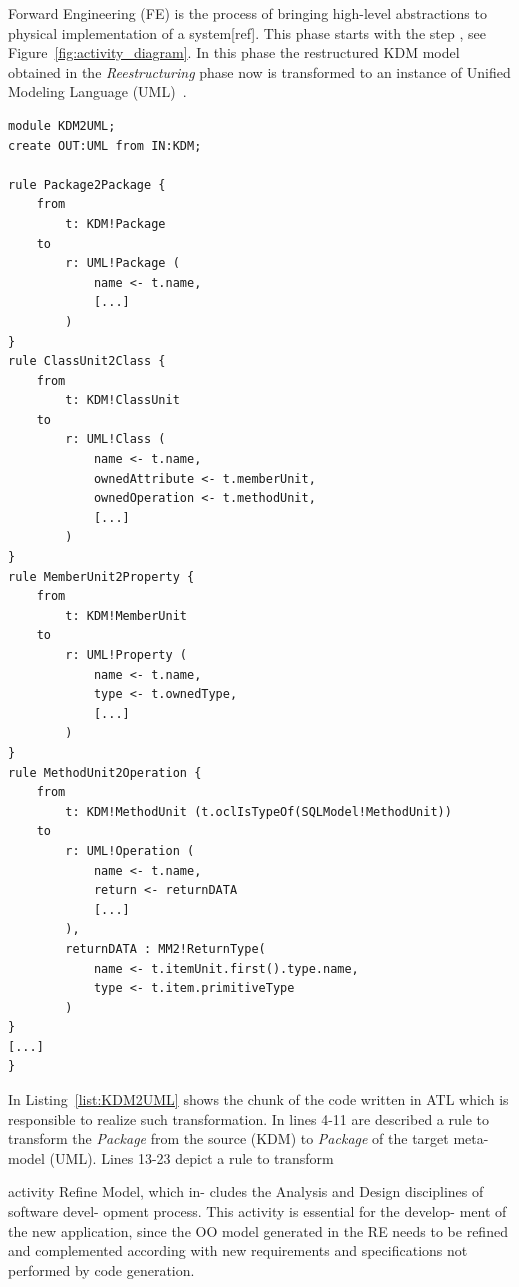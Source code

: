 \documentclass[a4paper,twoside]{article}
\newcommand*\circled[1]{\tikz[baseline=(char.base)]{
  \node[shape=circle,draw, inner sep=0.1pt] (char) {#1};}
}
\begin{document}
Forward Engineering (FE) is the process of bringing high-level abstractions to physical implementation of a system[ref]. This phase starts with the step \circled{\textbf{K}}, see Figure~\ref{fig:activity_diagram}. In this phase the restructured KDM model obtained in the \textit{Reestructuring} phase now is transformed to an instance of Unified Modeling Language (UML)~\cite{OMG}. 

\begin{lstlisting}[caption=Chunk of KDM2UML, label=list:KDM2UML, frame=lrtb, basicstyle=\tiny]
module KDM2UML;
create OUT:UML from IN:KDM;

rule Package2Package {
	from 
		t: KDM!Package
	to
		r: UML!Package (	
			name <- t.name,
			[...]
		)
}
rule ClassUnit2Class {
	from
		t: KDM!ClassUnit
	to
		r: UML!Class (
			name <- t.name,
			ownedAttribute <- t.memberUnit,
			ownedOperation <- t.methodUnit,
			[...]
		)
}
rule MemberUnit2Property {
	from
		t: KDM!MemberUnit
	to
		r: UML!Property (
			name <- t.name,
			type <- t.ownedType,
			[...]
		)
}
rule MethodUnit2Operation {	
	from
		t: KDM!MethodUnit (t.oclIsTypeOf(SQLModel!MethodUnit))
	to
		r: UML!Operation (
			name <- t.name,
			return <- returnDATA
			[...]
		),
		returnDATA : MM2!ReturnType(
			name <- t.itemUnit.first().type.name,
			type <- t.item.primitiveType
		)
}
[...]
}
\end{lstlisting}

In Listing~\ref{list:KDM2UML} shows the chunk of the code written in ATL which is responsible to realize such transformation. In lines 4-11 are described a rule to transform the \textit{Package} from the source (KDM) to \textit{Package} of the target meta-model (UML). Lines 13-23 depict a rule to transform   


  activity Refine Model, which in- cludes the Analysis and Design disciplines of software devel- opment process. This activity is essential for the develop- ment of the new application, since the OO model generated in the RE needs to be refined and complemented according with new requirements and specifications not performed by code generation.




\end{document}
